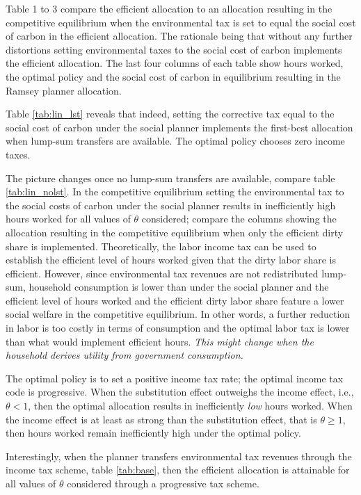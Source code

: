 Table 1 to 3 compare the efficient allocation to an allocation resulting in the competitive equilibrium when the environmental tax is set to equal the social cost of carbon in the efficient allocation. The rationale being that without any further distortions setting environmental taxes to the social cost of carbon implements the efficient allocation. The last four columns of each table show hours worked, the optimal policy and the social cost of carbon in equilibrium resulting in the Ramsey planner allocation. 

Table \ref{tab:lin_lst} reveals that indeed, setting the corrective tax equal to the social cost of carbon under the social planner implements the first-best allocation when lump-sum transfers are available. The optimal policy chooses zero income taxes. 

The picture changes once no lump-sum transfers are available, compare table \ref{tab:lin_nolst}. In the competitive equilibrium setting the environmental tax to the social costs of carbon under the social planner results in inefficiently high hours worked for all values of $\theta$ considered; compare the columns showing the allocation resulting in the competitive equilibrium when only the efficient dirty share is implemented. 
Theoretically, the labor income tax can be used to establish the 
efficient level of hours worked given that the dirty labor share is efficient. However, since
environmental tax revenues are not redistributed lump-sum, household consumption is lower than under the social planner and the efficient level of hours worked and the efficient dirty labor share feature a lower social welfare in the competitive equilibrium. In other words, a further reduction in labor is too costly in terms of consumption and the optimal labor tax is lower than what would implement efficient hours. \textit{This might change when the household derives utility from government consumption.}

The optimal policy is to set a positive income tax rate; the optimal income tax code is progressive. When the substitution effect outweighs the income effect, i.e., $\theta<1$, then the optimal allocation results in inefficiently \textit{low} hours worked. When the income effect is at least as strong than the substitution effect, that is $\theta\geq 1$, then hours worked remain inefficiently high under the optimal policy. 

Interestingly, when the planner transfers environmental tax revenues through the income tax scheme, table \ref{tab:base}, then the efficient allocation is attainable for all values of $\theta$ considered through a progressive tax scheme. 

